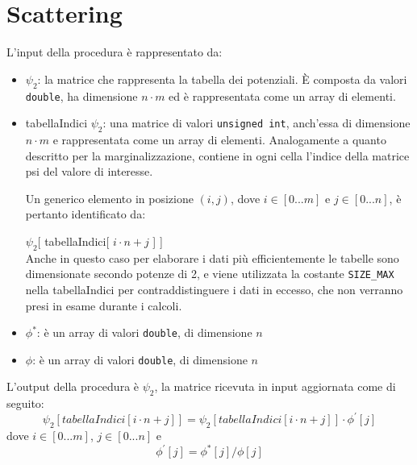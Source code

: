 \documentclass[a4paper]{article}   %
\begin{document}
\section{Scattering}
L'input della procedura è rappresentato da:
\begin{itemize}
\item $\psi_2$: la matrice che rappresenta la tabella dei potenziali. \`E composta da valori {\tt double}, ha dimensione $n \cdot m$ ed è rappresentata come un array di elementi.
\item tabellaIndici $\psi_2$: una matrice di valori {\tt unsigned int}, anch’essa di dimensione $n \cdot m$ e rappresentata come un array di elementi. Analogamente a quanto descritto per la marginalizzazione, contiene in ogni cella l’indice della matrice psi del valore di interesse.

Un generico elemento in posizione $(i, j)$, dove $i \in [0...m]$ e $j \in [0...n]$,
è pertanto identificato da: 

$\psi_2$[ tabellaIndici[ $i \cdot n + j$ ] ]\\
Anche in questo caso per elaborare i dati più efficientemente le tabelle sono dimensionate secondo potenze di 2, e viene utilizzata la costante {\tt SIZE\_MAX} nella tabellaIndici per contraddistinguere i dati in eccesso, che non verranno presi in esame durante i calcoli.

\item $\phi^{*}$: è un array di valori {\tt double}, di dimensione $n$
\item $\phi$: è un array di valori {\tt double}, di dimensione $n$
\end{itemize}


L'output della procedura è $\psi_2$, la matrice ricevuta in input aggiornata come di seguito:
\begin{equation}
\psi_2[ tabellaIndici[ i \cdot n + j ] ] = \psi_2[ tabellaIndici[ i \cdot n + j ] ] \cdot  \phi^{'}[ j ]
\end{equation}
dove $i \in [0...m]$, $j \in [0...n]$ e
\begin{equation}
 \phi^{'}[ j ] = \phi^{*}[ j ] / \phi[ j ]
\end{equation}
\end{document}
